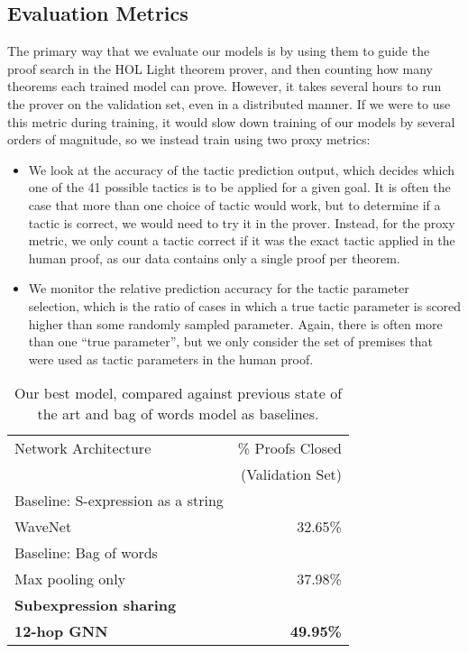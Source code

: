 \documentclass[letterpaper]{article} \usepackage{aaai20}  \usepackage{times}  \usepackage{helvet} \usepackage{courier}  \usepackage[hyphens]{url}  \usepackage{graphicx} \urlstyle{rm} \def\UrlFont{\rm}  \usepackage{graphicx}  \frenchspacing  \setlength{\pdfpagewidth}{8.5in}  \setlength{\pdfpageheight}{11in}
\newcommand{\citep}{\cite}
\begin{document}
\subsection{Evaluation Metrics}

The primary way that we evaluate our models is by using them to guide the proof search in the HOL Light theorem prover, and then counting how many theorems each trained model can prove. However, it takes several hours to run the prover on the validation set, even in a distributed manner.  If we were to use this metric during training, it would slow down training of our models by several orders of magnitude, so we instead train using two proxy metrics: 
\begin{itemize}
    \item We look at the accuracy of the tactic prediction output, which decides which one of the 41 possible tactics is to be applied for a given goal.  It is often the case that more than one choice of tactic would work, but to determine if a tactic is correct, we would need to try it in the prover. Instead, for the proxy metric, we only count a tactic correct if it was the exact tactic applied in the human proof, as our data contains only a single proof per theorem.
    \item We monitor the relative prediction accuracy for the tactic parameter selection, which is the ratio of cases in which a true tactic parameter is scored higher than some randomly sampled parameter.  Again, there is often more than one ``true parameter'', but we only consider the set of premises that were used as tactic parameters in the human proof.
\end{itemize}


\begin{table}
\centering
\caption{Our best model, compared against previous state of the art and bag of words model as baselines. }
    \begin{tabular}{lr}
    \hline
    Network Architecture & \% Proofs Closed \\
    & (Validation Set) \\
    \hline
    Baseline: S-expression as a string & \\
    WaveNet \citep{bansal2019holist} & 32.65\% \\
    Baseline: Bag of words & \\ 
    Max pooling only & 37.98\% \\
    \hline
    {\bf Subexpression sharing} & \\
    {\bf 12-hop GNN} & {\bf 49.95\%} \\
    \hline
\end{tabular}
\label{tab:proofs-closed-baselines}
\end{table}
\end{document}
